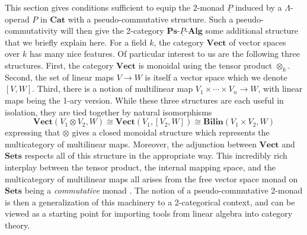 \documentclass{amsbook} %
\newcommand{\mb}{\mathbf}
\numberwithin{section}{chapter}
\begin{document}
This section gives conditions sufficient to equip the 2-monad $\underline{P}$ induced by a $\Lambda$-operad $P$ in $\mb{Cat}$ with a pseudo-commutative structure.  Such a pseudo-commutativity will then give the 2-category $\mb{Ps}\mbox{-}\underline{P}\mbox{-}\mb{Alg}$ some additional structure that we briefly explain here.  For a field $k$, the category $\mb{Vect}$ of vector spaces over $k$ has many nice features.  Of particular interest to us are the following three structures.  First, the category $\mb{Vect}$ is monoidal using the tensor product $\otimes_{k}$.  Second, the set of linear maps $V \rightarrow W$ is itself a vector space which we denote $[V,W]$.  Third, there is a notion of multilinear map $V_{1} \times \cdots \times V_{n} \rightarrow W$, with linear maps being the 1-ary version.  While these three structures are each useful in isolation, they are tied together by natural isomorphisms
\[
\mb{Vect}(V_{1} \otimes V_{2}, W) \cong \mb{Vect}(V_{1}, [V_{2}, W]) \cong \mb{Bilin}(V_{1} \times V_{2}, W)
\]
expressing that $\otimes$ gives a closed monoidal structure which represents the multicategory of multilinear maps.  Moreover, the adjunction between $\mb{Vect}$ and $\mb{Sets}$ respects all of this structure in the appropriate way.  This incredibly rich interplay between the tensor product, the internal mapping space, and the multicategory of multilinear maps all arises from the free vector space monad on $\mb{Sets}$ being a \textit{commutative} monad \cite{kock-monads, kock-closed, kock-strong}.  The notion of a pseudo-commutative 2-monad \cite{HP} is then a generalization of this machinery to a 2-categorical context, and can be viewed as a starting point for importing tools from linear algebra into category theory.
\end{document}
